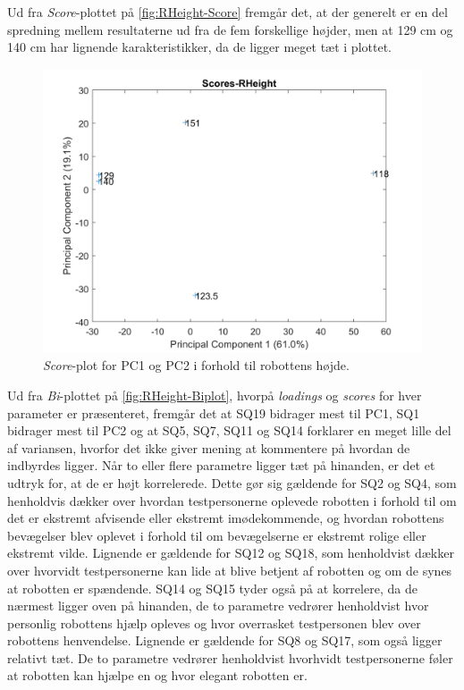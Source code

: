 \noindent
%
Ud fra \textit{Score}-plottet på \autoref{fig:RHeight-Score} fremgår det, at der generelt er en del spredning mellem resultaterne ud fra de fem forskellige højder, men at 129 cm og 140 cm har lignende karakteristikker, da de ligger meget tæt i plottet.
%
\begin{figure}[H]
\centering
\includegraphics[width=\textwidth]{Figure/DatabehandlingSkalaer/PCAfigures/RHeight-Scores}
\caption{\textit{Score}-plot for PC1 og PC2 i forhold til robottens højde.}
\label{fig:RHeight-Score}
\end{figure}
\noindent
%
Ud fra \textit{Bi}-plottet på \autoref{fig:RHeight-Biplot}, hvorpå \textit{loadings} og \textit{scores} for hver parameter er præsenteret, fremgår det at SQ19 bidrager mest til PC1, SQ1 bidrager mest til PC2 og at SQ5, SQ7, SQ11 og SQ14 forklarer en meget lille del af variansen, hvorfor det ikke giver mening at kommentere på hvordan de indbyrdes ligger. Når to eller flere parametre ligger tæt på hinanden, er det et udtryk for, at de er højt korrelerede. Dette gør sig gældende for SQ2 og SQ4, som henholdvis dækker over hvordan testpersonerne oplevede robotten i forhold til om det er ekstremt afvisende eller ekstremt imødekommende, og hvordan robottens bevægelser blev oplevet i forhold til om bevægelserne er ekstremt rolige eller ekstremt vilde. Lignende er gældende for SQ12 og SQ18, som henholdvist dækker over hvorvidt testpersonerne kan lide at blive betjent af robotten og om de synes at robotten er spændende. SQ14 og SQ15 tyder også på at korrelere, da de nærmest ligger oven på hinanden, de to parametre vedrører henholdvist hvor personlig robottens hjælp opleves og hvor overrasket testpersonen blev over robottens henvendelse. Lignende er gældende for SQ8 og SQ17, som også ligger relativt tæt. De to parametre vedrører henholdvist hvorhvidt testpersonerne føler at robotten kan hjælpe en og hvor elegant robotten er. 

